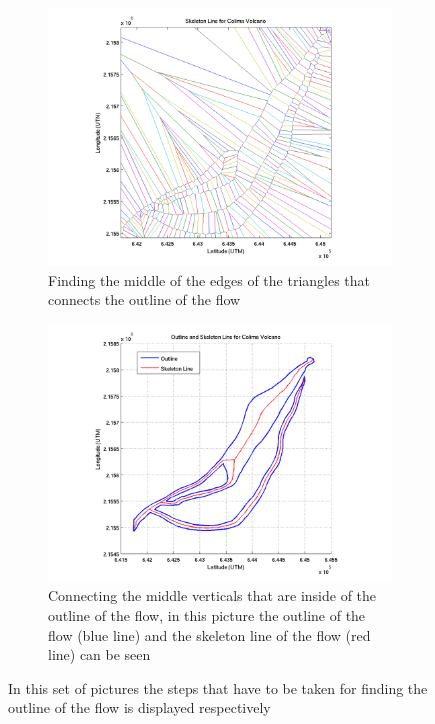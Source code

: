 \documentclass[letterpaper,10pt]{article}
\begin{document}
\begin{figure}
        \begin{subfigure}[b]{0.45\textwidth}
                \includegraphics[width=\textwidth]{IMAGES/pics/Skeleton_line.png}
                \caption{Finding the middle of the edges of the triangles that connects the outline of the flow}
                \label{fig:veroni}
        \end{subfigure}
        \begin{subfigure}[b]{0.45\textwidth}
                \includegraphics[width=\textwidth]{IMAGES/pics/Outline_Skeleton_line.png}
                \caption{Connecting the middle verticals that are inside of the outline of the flow, in this picture the
                outline of the flow (blue line) and the skeleton line of the flow (red line) can be seen}
                \label{fig:skeleton}
        \end{subfigure}
                
        \caption{In this set of pictures the steps that have to be taken for finding the outline of the flow is displayed 
        respectively}\label{fig:skeleton_line_proc}
\end{figure}
\end{document}
